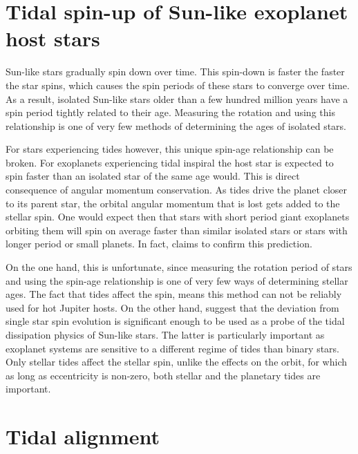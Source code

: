 \section{Tidal spin-up of Sun-like exoplanet host stars}

Sun-like stars gradually spin down over time. This spin-down is faster the
faster the star spins, which causes the spin periods of these stars to converge
over time. As a result, isolated Sun-like stars older than a few hundred million
years have a spin period tightly related to their age. Measuring the rotation
and using this relationship is one of very few methods of determining the ages
of isolated stars.

For stars experiencing tides however, this unique spin-age relationship can be
broken. For exoplanets experiencing tidal inspiral the host star is expected to
spin faster than an isolated star of the same age would. This is direct
consequence of angular momentum conservation. As tides drive the planet closer
to its parent star, the orbital angular momentum that is lost gets added to the
stellar spin. One would expect then that stars with short period giant
exoplanets orbiting them will spin on average faster than similar isolated stars
or stars with longer period or small planets. In fact, \citet{Tajeda_et_al_21}
claims to confirm this prediction.

On the one hand, this is unfortunate, since measuring the rotation period of
stars and using the spin-age relationship is one of very few ways of determining
stellar ages. The fact that tides affect the spin, means this method can not be
reliably used for hot Jupiter hosts. On the other hand, \citet{Penev_et_al_18}
suggest that the deviation from single star spin evolution is significant enough
to be used as a probe of the tidal dissipation physics of Sun-like stars. The
latter is particularly important as exoplanet systems are sensitive to a
different regime of tides than binary stars. Only stellar tides affect the
stellar spin, unlike the effects on the orbit, for which as long as eccentricity
is non-zero, both stellar and the planetary tides are important.

\section{Tidal alignment}

